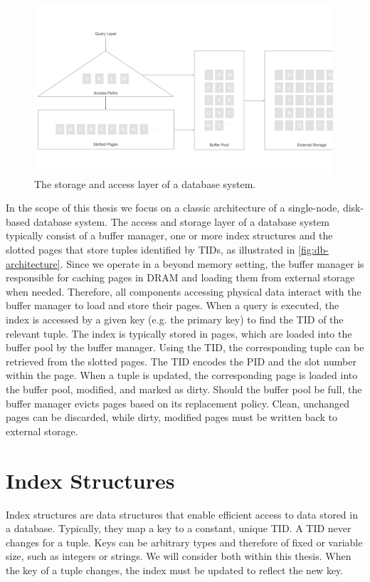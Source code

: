 \begin{figure}[htpb]
  \centering
  \includegraphics[width=0.99\textwidth]{figures/db_architecture.pdf}
  \caption{The storage and access layer of a database system.}
  \label{fig:db-architecture}
\end{figure}

In the scope of this thesis we focus on a classic architecture of a single-node, disk-based database system.
The access and storage layer of a database system typically consist of a buffer manager, one or more index structures and the slotted pages that store tuples identified by \ac{TID}s, as illustrated in \autoref{fig:db-architecture}.
Since we operate in a beyond memory setting, the buffer manager is responsible for caching pages in \ac{DRAM} and loading them from external storage when needed.
Therefore, all components accessing physical data interact with the buffer manager to load and store their pages.
When a query is executed, the index is accessed by a given key (e.g. the primary key) to find the \ac{TID} of the relevant tuple.
The index is typically stored in pages, which are loaded into the buffer pool by the buffer manager.
Using the \ac{TID}, the corresponding tuple can be retrieved from the slotted pages.
The \ac{TID} encodes the \ac{PID} and the slot number within the page.
When a tuple is updated, the corresponding page is loaded into the buffer pool, modified, and marked as dirty.
Should the buffer pool be full, the buffer manager evicts pages based on its replacement policy.
Clean, unchanged pages can be discarded, while dirty, modified pages must be written back to external storage.


\section{Index Structures}
Index structures are data structures that enable efficient access to data stored in a database.
Typically, they map a key to a constant, unique \ac{TID}. A \ac{TID} never changes for a tuple.
Keys can be arbitrary types and therefore of fixed or variable size, such as integers or strings.
We will consider both within this thesis.
When the key of a tuple changes, the index must be updated to reflect the new key.


